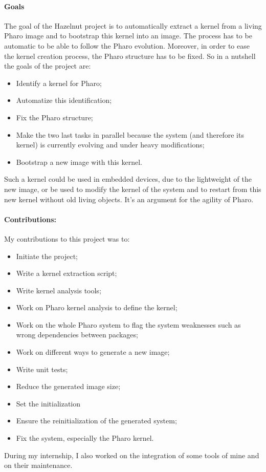 \paragraph{Goals}
The goal of the Hazelnut project is to automatically extract a kernel from a living \gls{Pharo} image and to bootstrap this kernel into an image. The process has to be automatic to be able to follow the \gls{Pharo} evolution. Moreover, in order to ease the kernel creation process, the \gls{Pharo} structure has to be fixed. So in a nutshell the goals of the project are:
	\begin{itemize}
		\item Identify a kernel for \gls{Pharo};
		\item Automatize this identification;
		\item Fix the \gls{Pharo} structure;
		\item Make the two last tasks in parallel because the system (and therefore its kernel) is currently evolving and under heavy modifications;
		\item Bootstrap a new image with this kernel.
	\end{itemize}
Such a kernel could be used in embedded devices, due to the lightweight of the new image, or be used to modify the kernel of the system and to restart from this new kernel without old living objects. It's an argument for the agility of \gls{Pharo}.

\paragraph{Contributions:}
My contributions to this project was to:
	\begin{itemize}
		\item Initiate the project;
		\item Write a kernel extraction script;
		\item Write kernel analysis tools;
		\item Work on \gls{Pharo} kernel analysis to define the kernel;
		\item Work on the whole \gls{Pharo} system to flag the system weaknesses such as wrong dependencies between packages;
		\item Work on different ways to generate a new image;
		\item Write unit tests;
		\item Reduce the generated image size;
		\item Set the initialization
		\item Ensure the reinitialization of the generated system;
		\item Fix the system, especially the \gls{Pharo} kernel.
	\end{itemize}
During my internship, I also worked on the integration of some tools of mine and on their maintenance.